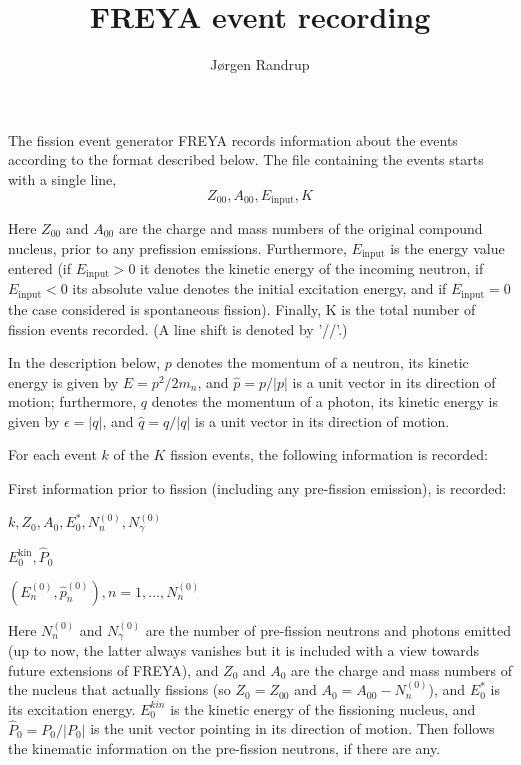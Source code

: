 \documentclass{article}
\begin{document}
\title{FREYA event recording}
\author{J{\o}rgen Randrup}

\maketitle

The fission event generator FREYA records information about the events according to the format described below. The file containing the events starts with a single line,
\[
Z_{00},A_{00},E_{\text{input}},K 
\]

Here $Z_{00}$ and $A_{00}$ are the charge and mass numbers of the original compound nucleus, prior to any prefission emissions. Furthermore, $E_{\text{input}}$ is the energy value entered (if $E_{\text{input}} > 0$ it denotes the kinetic energy of the incoming neutron, if $E_{\text{input}} < 0$ its absolute value denotes the
initial excitation energy, and if $E_{\text{input}} = 0$ the case considered is spontaneous fission). Finally, K is the total number of fission events recorded. (A line shift is denoted by ’//’.)

In the description below, $p$ denotes the momentum of a neutron, its kinetic energy is given by $E = p^2/2m_n$, and $\hat p = p/|p|$ is a unit vector in its direction of motion; furthermore, $q$ denotes the momentum of a photon, its kinetic energy is given by $\epsilon = |q|$, and $\hat q = q/|q|$ is a unit vector in its direction of motion. 

For each event $k$ of the $K$ fission events, the following information is recorded:

First information prior to fission (including any pre-fission emission), is recorded:

$k,Z_0,A_0,E_0^*, N_n^{(0)}, N_{\gamma}^{(0)}$

$E_0^{\text{kin}} , \hat P_0$

$(E_n^{(0)} , \hat p_n^{(0)}), n = 1, . . . ,N_n^{(0)}$

Here $N^{(0)}_n$ and $N^{(0)}_{\gamma}$ are the number of pre-fission neutrons and photons emitted (up to now, the latter always vanishes but it is included with a view towards future extensions of FREYA), and $Z_0$ and $A_0$ are the charge and mass numbers of the nucleus that actually fissions (so $Z_0 = Z_{00}$
and $A_0 = A_{00}−N_n^{(0)}$), and $E_0^*$ is its excitation energy. $E_0^{kin}$ is the kinetic energy of the fissioning nucleus, and 
$\hat P_0 = P_0 / |P_0|$
is the unit vector pointing in its direction of motion. Then follows the kinematic information on the pre-fission neutrons, if there are any.
\end{document}
